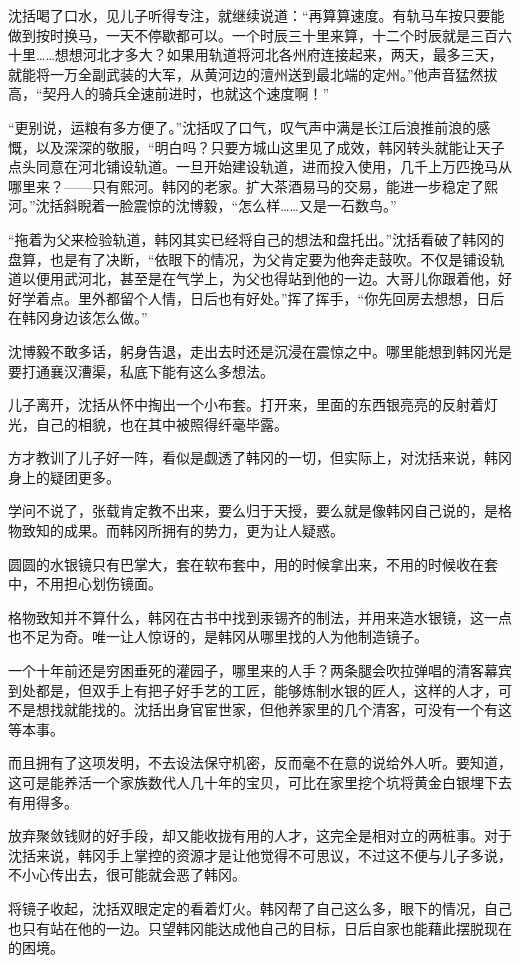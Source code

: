 沈括喝了口水，见儿子听得专注，就继续说道：“再算算速度。有轨马车按只要能做到按时换马，一天不停歇都可以。一个时辰三十里来算，十二个时辰就是三百六十里……想想河北才多大？如果用轨道将河北各州府连接起来，两天，最多三天，就能将一万全副武装的大军，从黄河边的澶州送到最北端的定州。”他声音猛然拔高，“契丹人的骑兵全速前进时，也就这个速度啊！”

“更别说，运粮有多方便了。”沈括叹了口气，叹气声中满是长江后浪推前浪的感慨，以及深深的敬服，“明白吗？只要方城山这里见了成效，韩冈转头就能让天子点头同意在河北铺设轨道。一旦开始建设轨道，进而投入使用，几千上万匹挽马从哪里来？——只有熙河。韩冈的老家。扩大茶酒易马的交易，能进一步稳定了熙河。”沈括斜睨着一脸震惊的沈博毅，“怎么样……又是一石数鸟。”

“拖着为父来检验轨道，韩冈其实已经将自己的想法和盘托出。”沈括看破了韩冈的盘算，也是有了决断，“依眼下的情况，为父肯定要为他奔走鼓吹。不仅是铺设轨道以便用武河北，甚至是在气学上，为父也得站到他的一边。大哥儿你跟着他，好好学着点。里外都留个人情，日后也有好处。”挥了挥手，“你先回房去想想，日后在韩冈身边该怎么做。”

沈博毅不敢多话，躬身告退，走出去时还是沉浸在震惊之中。哪里能想到韩冈光是要打通襄汉漕渠，私底下能有这么多想法。

儿子离开，沈括从怀中掏出一个小布套。打开来，里面的东西银亮亮的反射着灯光，自己的相貌，也在其中被照得纤毫毕露。

方才教训了儿子好一阵，看似是觑透了韩冈的一切，但实际上，对沈括来说，韩冈身上的疑团更多。

学问不说了，张载肯定教不出来，要么归于天授，要么就是像韩冈自己说的，是格物致知的成果。而韩冈所拥有的势力，更为让人疑惑。

圆圆的水银镜只有巴掌大，套在软布套中，用的时候拿出来，不用的时候收在套中，不用担心划伤镜面。

格物致知并不算什么，韩冈在古书中找到汞锡齐的制法，并用来造水银镜，这一点也不足为奇。唯一让人惊讶的，是韩冈从哪里找的人为他制造镜子。

一个十年前还是穷困垂死的灌园子，哪里来的人手？两条腿会吹拉弹唱的清客幕宾到处都是，但双手上有把子好手艺的工匠，能够炼制水银的匠人，这样的人才，可不是想找就能找的。沈括出身官宦世家，但他养家里的几个清客，可没有一个有这等本事。

而且拥有了这项发明，不去设法保守机密，反而毫不在意的说给外人听。要知道，这可是能养活一个家族数代人几十年的宝贝，可比在家里挖个坑将黄金白银埋下去有用得多。

放弃聚敛钱财的好手段，却又能收拢有用的人才，这完全是相对立的两桩事。对于沈括来说，韩冈手上掌控的资源才是让他觉得不可思议，不过这不便与儿子多说，不小心传出去，很可能就会恶了韩冈。

将镜子收起，沈括双眼定定的看着灯火。韩冈帮了自己这么多，眼下的情况，自己也只有站在他的一边。只望韩冈能达成他自己的目标，日后自家也能藉此摆脱现在的困境。

